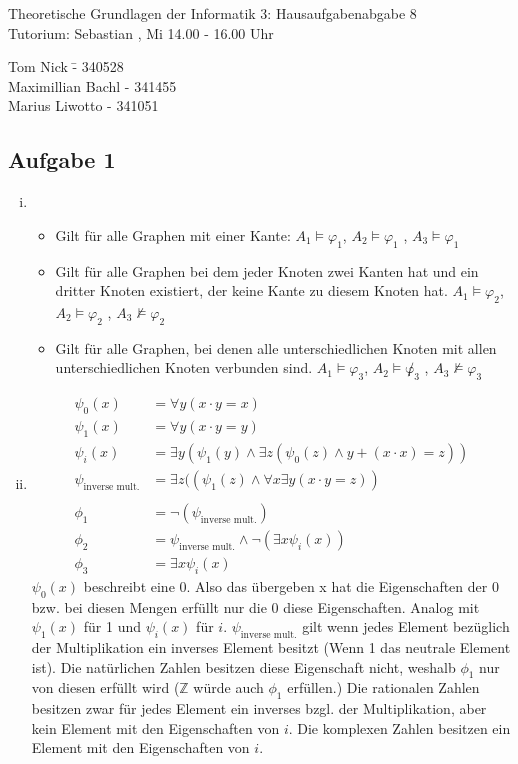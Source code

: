\documentclass[a4paper,10pt]{article}
\begin{document}
\begin{center}
\Large{Theoretische Grundlagen der Informatik 3: Hausaufgabenabgabe 8} \\
\large{Tutorium: Sebastian , Mi 14.00 - 16.00 Uhr}
\end{center}
\begin{tabbing}
Tom Nick \hspace{2cm}\= - 340528\\
Maximillian Bachl \> - 341455 \\
Marius Liwotto\> -  341051
\end{tabbing}
\subsection*{Aufgabe 1}
\begin{enumerate}[(i)]
	\item 
	\begin{itemize}
		\item 	Gilt für alle Graphen mit einer Kante: $A_1 \vDash \varphi_1$, $A_2 \vDash \varphi_1$ , $A_3 \vDash \varphi_1$
		\item 	Gilt für alle Graphen bei dem jeder Knoten zwei Kanten hat und ein dritter Knoten existiert, der keine Kante zu diesem Knoten hat.
			$A_1 \vDash \varphi_2$, $A_2 \vDash \varphi_2$ , $A_3 \not\vDash \varphi_2$
		\item  	Gilt für alle Graphen, bei denen alle unterschiedlichen Knoten mit allen unterschiedlichen Knoten verbunden sind.
			$A_1 \vDash \varphi_3$, $A_2 \vDash \not\varphi_3$ , $A_3 \not\vDash \varphi_3$
	\end{itemize}
	\item 
	\begin{align*}
		\psi_0(x) &= \forall y(x \cdot y = x) \\
		\psi_1(x) &= \forall y(x \cdot y = y) \\
		\psi_i(x) &= \exists y(\psi_1(y) \land \exists z(\psi_0(z) \land y + (x \cdot x) = z)) \\
		\psi_{\text{inverse mult.}} &=\exists z((\psi_1(z)  \land \forall x \exists y (x \cdot y = z)) \\
		&\\
		\phi_1 &= \lnot(\psi_{\text{inverse mult.}}) \\
		\phi_2 &= \psi_{\text{inverse mult.}} \land \lnot(\exists x\psi_i(x)) \\
		\phi_3 &= \exists x \psi_i(x)
	\end{align*}
$\psi_0(x)$ beschreibt eine 0. Also das übergeben x hat die Eigenschaften der 0 bzw. bei diesen Mengen erfüllt nur die 0 diese Eigenschaften. Analog mit $\psi_1(x)$ für 1 und $\psi_i(x)$ für $i$. $\psi_{\text{inverse mult.}}$ gilt wenn jedes Element bezüglich der Multiplikation ein inverses Element besitzt (Wenn 1 das neutrale Element ist). Die natürlichen Zahlen besitzen diese Eigenschaft nicht, weshalb $\phi_1$ nur von diesen erfüllt wird ($\mathbb{Z}$ würde auch $\phi_1$ erfüllen.)
Die rationalen Zahlen besitzen zwar für jedes Element ein inverses bzgl. der Multiplikation, aber kein Element mit den Eigenschaften von $i$. Die komplexen Zahlen besitzen ein Element mit den Eigenschaften von $i$.
\end{enumerate}
\end{document}
